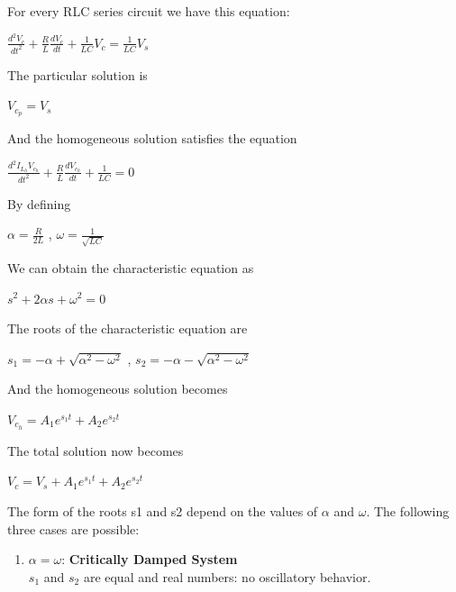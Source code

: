 \documentclass[a4paper,twoside]{report}
\begin{document}
        {
            For every RLC series circuit we have this equation:
            \begin{center}
                $\frac{d^2 V_c}{d t^2} + \frac{R}{L}\frac{d V_c}{d t} + \frac{1}{LC}V_c = \frac{1}{LC}V_s$
            \end{center}
            The particular solution is
            \begin{center}
                $V_{c_p} = V_s$
            \end{center}
            And the homogeneous solution satisfies the equation
            \begin{center}
                $\frac{d^2 I_{L_h}V_{c_h}}{d t^2} + \frac{R}{L}\frac{d V_{c_h}}{d t} + \frac{1}{LC} = 0$
            \end{center}
            By defining
            \begin{center}
                $\alpha = \frac{R}{2L}$ ,
                $\omega = \frac{1}{\sqrt{LC}}$
            \end{center}
            We can obtain the characteristic equation as
            \begin{center}
                $s^2 + 2\alpha s + \omega ^ 2 = 0$
            \end{center}
            The roots of the characteristic equation are
            \begin{center}
                $s_1 = -\alpha + \sqrt{\alpha ^ 2 - \omega ^ 2}$ ,
                $s_2 = -\alpha - \sqrt{\alpha ^ 2 - \omega ^ 2}$
            \end{center}
            And the homogeneous solution becomes
            \begin{center}
                $V_{c_h} = A_1e^{s_1t} + A_2e^{s_2t}$
            \end{center}
            The total solution now becomes
            \begin{center}
                $V_c = V_s + A_1e^{s_1t} + A_2e^{s_2t}$
            \end{center}
            The form of the roots s1 and s2 depend on the values of
            $\alpha$ and $\omega$. The following three cases are possible:
            \begin{enumerate}
                \item
                    $\alpha = \omega$: \textbf{Critically Damped System} \\
                    $s_1$ and $s_2$ are equal and real numbers: no oscillatory behavior.


\end{enumerate}}
\end{document}
